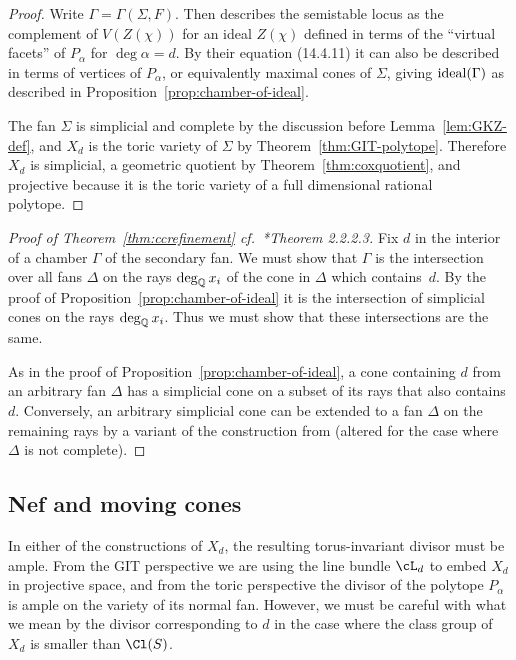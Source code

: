 \documentclass{article}
\begin{document}
\begin{proof}
  Write $\Gamma=\Gamma(\Sigma,F)$.  Then \cite[Corollary 14.2.22]{CLS2011} describes the semistable locus as the complement of $V(Z(\chi))$ for an ideal $Z(\chi)$ defined in terms of the ``virtual facets'' of $P_\alpha$ for $\deg\alpha=d$.  By their equation (14.4.11) it can also be described in terms of vertices of $P_\alpha$, or equivalently maximal cones of $\Sigma$, giving $\operatorname{ideal}(\Gamma)$ as described in Proposition~\ref{prop:chamber-of-ideal}.

  The fan $\Sigma$ is simplicial and complete by the discussion before Lemma~\ref{lem:GKZ-def}, and $X_d$ is the toric variety of $\Sigma$ by Theorem~\ref{thm:GIT-polytope}.  Therefore $X_d$ is simplicial, a geometric quotient by Theorem~\ref{thm:coxquotient}, and projective because it is the toric variety of a full dimensional rational polytope.
\end{proof}

\begin{proof}[Proof of Theorem~\ref{thm:ccrefinement} cf.~\cite{ADHL2015}*{Theorem 2.2.2.3}]
  Fix $d$ in the interior of a chamber $\Gamma$ of the secondary fan.  We must show that $\Gamma$ is the intersection over all fans $\Delta$ on the rays $\deg_\mathbb Q x_i$ of the cone in $\Delta$ which contains~$d$.  By the proof of Proposition~\ref{prop:chamber-of-ideal} it is the intersection of simplicial cones on the rays $\deg_\mathbb Q x_i$.  Thus we must show that these intersections are the same.

  As in the proof of Proposition~\ref{prop:chamber-of-ideal}, a cone containing $d$ from an arbitrary fan $\Delta$ has a simplicial cone on a subset of its rays that also contains $d$.  Conversely, an arbitrary simplicial cone can be extended to a fan $\Delta$ on the remaining rays by a variant of the construction from \cite[Lemma 15.2.10]{CLS2011} (altered for the case where $\Delta$ is not complete).
\end{proof}

\subsection{Nef and moving cones}\label{sec:lower-Pic-rank}

In either of the constructions of $X_d$, the resulting torus-invariant divisor must be ample.  From the GIT perspective we are using the line bundle $\cL_d$ to embed $X_d$ in projective space, and from the toric perspective the divisor of the polytope $P_\alpha$ is ample on the variety of its normal fan.  However, we must be careful with what we mean by the divisor corresponding to $d$ in the case where the class group of $X_d$ is smaller than $\Cl(S)$.
\end{document}
